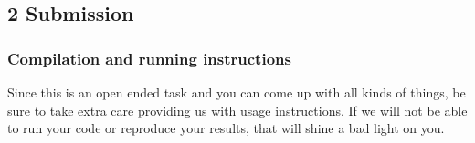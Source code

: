 \subsection*{2 Submission}

\subsubsection*{Compilation and running instructions}

Since this is an open ended task and you can come up with all kinds of things, be sure to take extra care providing us with usage instructions. If we will not be able to run your code or reproduce your results, that will shine a bad light on you. 
